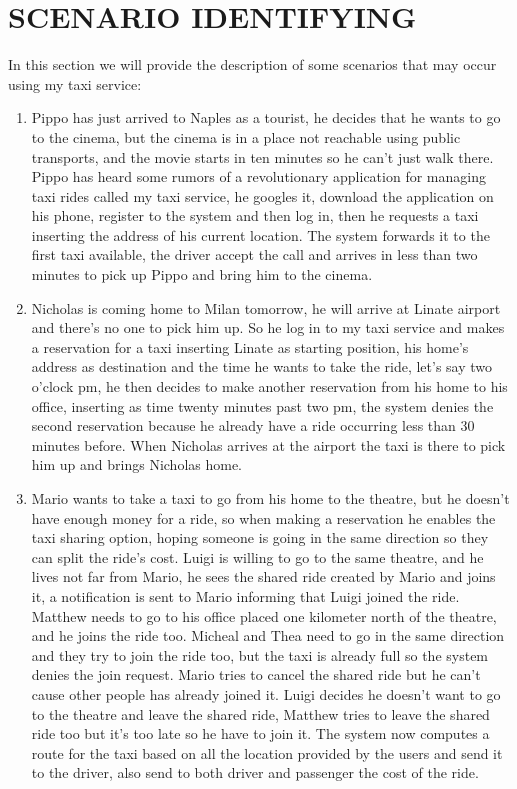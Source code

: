 
\section{SCENARIO IDENTIFYING}

In this section we will provide the description of some scenarios that may occur using my taxi service:
\begin{enumerate}
	\item Pippo has just arrived to Naples as a tourist, he decides that he wants to go to the cinema, but the cinema is in a place not reachable using public transports, and the movie starts in ten minutes so he can't just walk there. Pippo has heard some rumors of a revolutionary application for managing taxi rides called my taxi service, he googles it, download the application on his phone, register to the system and then log in, then he requests a taxi inserting the address of his current location. The system forwards it to the first taxi available, the driver accept the call and arrives in less than two minutes to pick up Pippo and bring him to the cinema.
	\item Nicholas is coming home to Milan tomorrow, he will arrive at Linate airport and there's no one to pick him up. So he log in to my taxi service and makes a reservation for a taxi inserting Linate as starting position, his home's address as destination and the time he wants to take the ride, let's say two o'clock pm, he then decides to make another reservation from his home to his office, inserting as time twenty minutes past two pm, the system denies the second reservation because he already have a ride occurring less than 30 minutes before. When Nicholas arrives at the airport the taxi is there to pick him up and brings Nicholas home.
	\item Mario wants to take a taxi to go from his home to the theatre, but he doesn't have enough money for a ride, so when making a reservation he enables the taxi sharing option, hoping someone is going in the same direction so they can split the ride's cost. Luigi is willing to go to the same theatre, and he lives not far from Mario, he sees the shared ride created by Mario and joins it, a notification is sent to Mario informing that Luigi joined the ride. Matthew needs to go to his office placed one kilometer north of the theatre, and he joins the ride too. Micheal and Thea need to go in the same direction and they try to join the ride too, but the taxi is already full so the system denies the join request. Mario tries to cancel the shared ride but he can't cause other people has already joined it. Luigi decides he doesn't want to go to the theatre and leave the shared ride, Matthew tries to leave the shared ride too but it's too late so he have to join it. The system now computes a route for the taxi based on all the location provided by the users and send it to the driver, also send to both driver and passenger the cost of the ride.

\end{enumerate}
